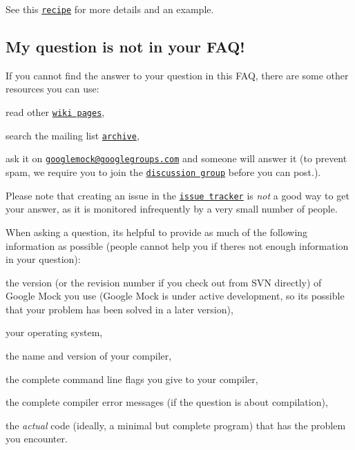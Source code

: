See this \href{http://code.google.com/p/googlemock/wiki/V1_7_CookBook#Mocking_Side_Effects}{\tt recipe} for more details and an example.

\subsection*{My question is not in your F\+A\+Q!}

If you cannot find the answer to your question in this F\+AQ, there are some other resources you can use\+:


\begin{DoxyEnumerate}
\item read other \href{http://code.google.com/p/googlemock/w/list}{\tt wiki pages},
\end{DoxyEnumerate}
\begin{DoxyEnumerate}
\item search the mailing list \href{http://groups.google.com/group/googlemock/topics}{\tt archive},
\end{DoxyEnumerate}
\begin{DoxyEnumerate}
\item ask it on \href{mailto:googlemock@googlegroups.com}{\tt googlemock@googlegroups.\+com} and someone will answer it (to prevent spam, we require you to join the \href{http://groups.google.com/group/googlemock}{\tt discussion group} before you can post.).
\end{DoxyEnumerate}

Please note that creating an issue in the \href{http://code.google.com/p/googlemock/issues/list}{\tt issue tracker} is {\itshape not} a good way to get your answer, as it is monitored infrequently by a very small number of people.

When asking a question, it\textquotesingle{}s helpful to provide as much of the following information as possible (people cannot help you if there\textquotesingle{}s not enough information in your question)\+:


\begin{DoxyItemize}
\item the version (or the revision number if you check out from S\+VN directly) of Google Mock you use (Google Mock is under active development, so it\textquotesingle{}s possible that your problem has been solved in a later version),
\item your operating system,
\item the name and version of your compiler,
\item the complete command line flags you give to your compiler,
\item the complete compiler error messages (if the question is about compilation),
\item the {\itshape actual} code (ideally, a minimal but complete program) that has the problem you encounter. 
\end{DoxyItemize}
